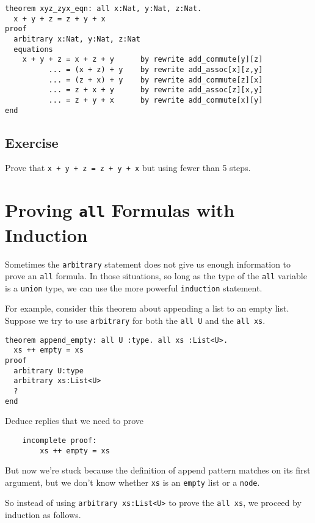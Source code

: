 \documentclass[12pt]{article}
\begin{document}
\begin{verbatim}
theorem xyz_zyx_eqn: all x:Nat, y:Nat, z:Nat.
  x + y + z = z + y + x
proof
  arbitrary x:Nat, y:Nat, z:Nat
  equations
    x + y + z = x + z + y      by rewrite add_commute[y][z]
          ... = (x + z) + y    by rewrite add_assoc[x][z,y]
          ... = (z + x) + y    by rewrite add_commute[z][x]
          ... = z + x + y      by rewrite add_assoc[z][x,y]
          ... = z + y + x      by rewrite add_commute[x][y]
end
\end{verbatim}

\subsection*{Exercise}

Prove that \texttt{x + y + z = z + y + x} but using fewer than 5 steps.

\pagebreak

\section{Proving \texttt{all} Formulas with Induction}
\label{sec:induction}

Sometimes the \texttt{arbitrary} statement does not give us enough
information to prove an \texttt{all} formula. In those situations, so
long as the type of the \texttt{all} variable is a \texttt{union}
type, we can use the more powerful \texttt{induction} statement.

For example, consider this theorem about appending a list to an empty
list. Suppose we try to use \texttt{arbitrary} for both the
\texttt{all U} and the \texttt{all xs}.

\begin{verbatim}
theorem append_empty: all U :type. all xs :List<U>.
  xs ++ empty = xs
proof
  arbitrary U:type
  arbitrary xs:List<U>
  ?
end
\end{verbatim}

\noindent Deduce replies that we need to prove

\begin{verbatim}
    incomplete proof:
        xs ++ empty = xs
\end{verbatim}

\noindent But now we're stuck because the definition of append pattern
matches on its first argument, but we don't know whether \texttt{xs}
is an \texttt{empty} list or a \texttt{node}.

So instead of using \texttt{arbitrary xs:List<U>} to prove the
\texttt{all xs}, we proceed by induction as follows.
\end{document}
